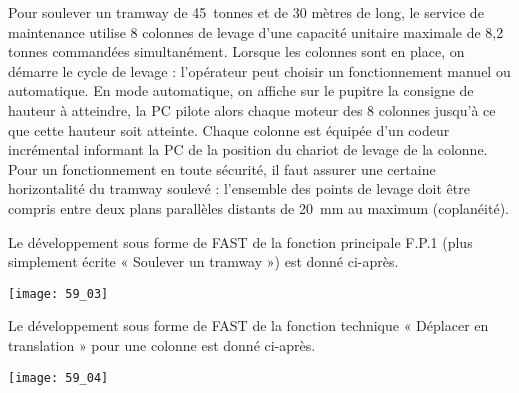 Pour soulever un tramway de \SI{45}{tonnes} et de 30 mètres de long, le service de maintenance utilise 8
colonnes de levage d'une capacité unitaire maximale de 8,2 tonnes commandées simultanément. Lorsque les colonnes sont en place, on démarre le cycle de levage :
l’opérateur peut choisir un fonctionnement manuel ou automatique. En mode automatique, on
affiche sur le pupitre la consigne de hauteur à atteindre, la PC pilote alors chaque moteur des 8
colonnes jusqu’à ce que cette hauteur soit atteinte. Chaque colonne est équipée d’un codeur
incrémental informant la PC de la position du chariot de levage de la colonne. Pour un
fonctionnement en toute sécurité, il faut assurer une certaine horizontalité du tramway soulevé :
l'ensemble des points de levage doit être compris entre deux plans parallèles distants de \SI{20}{mm} au
maximum (coplanéité).

Le développement sous forme de FAST de la fonction principale F.P.1 (plus simplement écrite
« Soulever un tramway ») est donné ci-après.

\begin{marginfigure}
\centering
\texttt{[image: 59\_03]}
\end{marginfigure}

Le développement sous forme de FAST de la fonction technique « Déplacer en translation » pour
une colonne est donné ci-après.

\begin{marginfigure}
\centering
\texttt{[image: 59\_04]}
\end{marginfigure}


\fi




\ifprof
\else


\fi